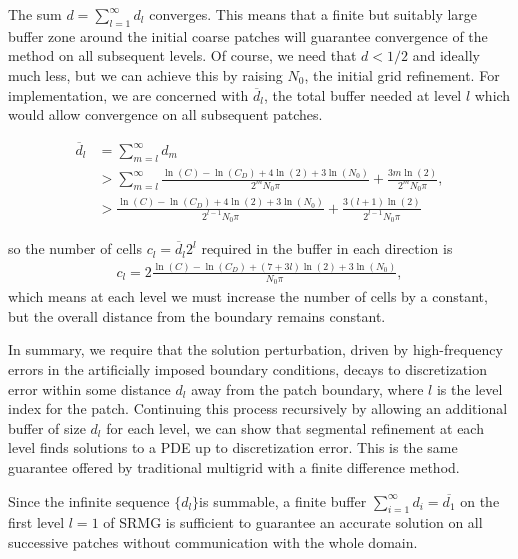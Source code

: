 \documentclass[final]{siamart1116}
\numberwithin{theorem}{section}
\begin{document}
The sum $d = \sum^\infty_{l=1} d_l$ converges. This means that a finite but suitably large buffer zone around the initial coarse patches will guarantee convergence of the method on all subsequent levels. Of course, we need that $d < 1/2$ and
ideally much less, but we can achieve this by raising $N_0$, the initial grid refinement. For implementation, we are
concerned with $\overline d_l$, the total buffer needed at level $l$ which would allow convergence on all subsequent patches. 


\begin{align}
  \overline d_l &= \sum^\infty_{m=l} d_m \nonumber \\
 &> \sum^\infty_{m=l} \frac{\ln(C) - \ln(C_D) + 4 \ln(2) + 3 \ln(N_0)}{2^m N_0 \pi} + \frac{3m \ln(2)}{2^m N_0 \pi}, \nonumber \\
 &> \frac{\ln(C) - \ln(C_D) + 4 \ln(2) + 3 \ln(N_0)}{2^{l-1} N_0 \pi} + \frac{3 (l+1) \ln(2)}{2^{l-1} N_0 \pi} \label{bufferreq}
\end{align}

so the number of cells $c_l = \overline d_l 2^l$ required in the buffer in each direction is
\begin{align*}
  c_l = 2 \frac{\ln(C) - \ln(C_D) + (7+3l) \ln(2) + 3 \ln(N_0)}{N_0 \pi},
\end{align*}
which means at each level we must increase the number of cells by a constant, but the overall distance from the boundary
remains constant.

In summary, we require that the solution perturbation, driven by high-frequency errors in the artificially imposed boundary conditions, decays to discretization error within some distance $d_l$ away from the patch boundary, where $l$ is the level index for the patch. Continuing this process recursively  by allowing an additional buffer of size $d_l$ for each level, we can show that segmental refinement at each level finds solutions to a PDE up to discretization error. This is the same guarantee offered by traditional multigrid with a finite difference method. 

Since the infinite sequence $\{d_l\}$is summable, a finite buffer $\sum_{i=1}^\infty d_i = \overline{d_1}$ on the first level $l=1$ of SRMG is sufficient to guarantee an accurate solution on all successive patches without communication with the whole domain. 
            
\end{document}
